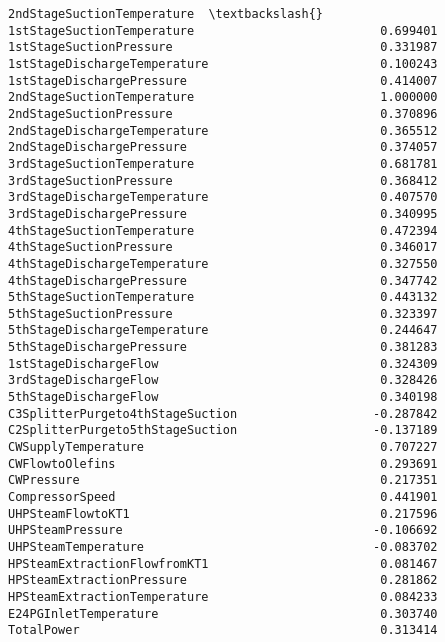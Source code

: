 \documentclass[11pt]{article}
\begin{document}
\begin{tcolorbox}[breakable, size=fbox, boxrule=.5pt, pad at break*=1mm, opacityfill=0]
\begin{Verbatim}[commandchars=\\\{\}]
                                  2ndStageSuctionTemperature  \textbackslash{}
1stStageSuctionTemperature                          0.699401
1stStageSuctionPressure                             0.331987
1stStageDischargeTemperature                        0.100243
1stStageDischargePressure                           0.414007
2ndStageSuctionTemperature                          1.000000
2ndStageSuctionPressure                             0.370896
2ndStageDischargeTemperature                        0.365512
2ndStageDischargePressure                           0.374057
3rdStageSuctionTemperature                          0.681781
3rdStageSuctionPressure                             0.368412
3rdStageDischargeTemperature                        0.407570
3rdStageDischargePressure                           0.340995
4thStageSuctionTemperature                          0.472394
4thStageSuctionPressure                             0.346017
4thStageDischargeTemperature                        0.327550
4thStageDischargePressure                           0.347742
5thStageSuctionTemperature                          0.443132
5thStageSuctionPressure                             0.323397
5thStageDischargeTemperature                        0.244647
5thStageDischargePressure                           0.381283
1stStageDischargeFlow                               0.324309
3rdStageDischargeFlow                               0.328426
5thStageDischargeFlow                               0.340198
C3SplitterPurgeto4thStageSuction                   -0.287842
C2SplitterPurgeto5thStageSuction                   -0.137189
CWSupplyTemperature                                 0.707227
CWFlowtoOlefins                                     0.293691
CWPressure                                          0.217351
CompressorSpeed                                     0.441901
UHPSteamFlowtoKT1                                   0.217596
UHPSteamPressure                                   -0.106692
UHPSteamTemperature                                -0.083702
HPSteamExtractionFlowfromKT1                        0.081467
HPSteamExtractionPressure                           0.281862
HPSteamExtractionTemperature                        0.084233
E24PGInletTemperature                               0.303740
TotalPower                                          0.313414


\end{Verbatim}
\end{tcolorbox}
\end{document}
